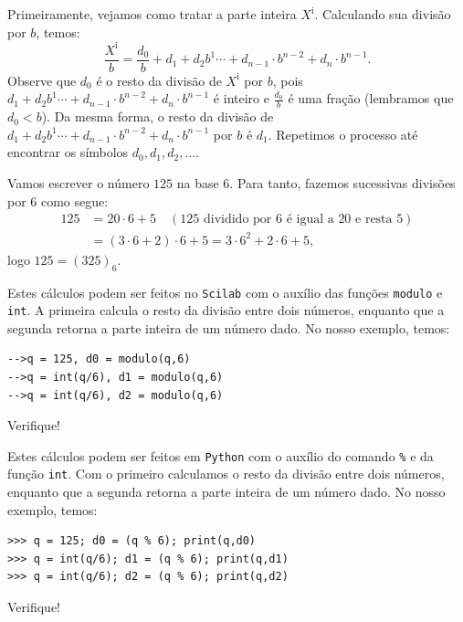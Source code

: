 Primeiramente, vejamos como tratar a parte inteira $X^{\mbox{i}}$. Calculando sua divisão por $b$, temos:
\begin{equation*}
  \frac{X^{\mbox{i}}}{b}=   \frac{d_0}{b}+d_1+d_2 b^1\cdots+d_{n-1}\cdot b^{n-2} +d_n\cdot b^{n-1}.  
\end{equation*}
Observe que $d_0$ é o resto da divisão de $X^{\mbox{i}}$ por $b$, pois $d_1+d_2 b^1\cdots+d_{n-1}\cdot b^{n-2} +d_n\cdot b^{n-1}$ é inteiro e $\frac{d_0}{b}$ é uma fração (lembramos que $d_0<b$). Da mesma forma, o resto da divisão de $d_1+d_2 b^1\cdots+d_{n-1}\cdot b^{n-2} +d_n\cdot b^{n-1}$ por $b$ é $d_1$. Repetimos o processo até encontrar os símbolos $d_0, d_1, d_2, \ldots$.

\begin{ex} Vamos escrever o número $125$ na base $6$. Para tanto, fazemos sucessivas divisões por $6$ como segue:
  \begin{equation*}
    \begin{split}
      125 &= 20\cdot 6 + 5\quad(\mbox{$125$ dividido por $6$ é igual a $20$ e resta $5$})\\
      &= (3\cdot 6 + 2)\cdot 6 + 5 = 3\cdot 6^2 + 2\cdot 6 + 5,      
    \end{split}
  \end{equation*}
logo $125 = (325)_6$.

\ifisscilab
Estes cálculos podem ser feitos no \verb+Scilab+ com o auxílio das funções \verb'modulo' e \verb'int'. A primeira calcula o resto da divisão entre dois números, enquanto que a segunda retorna a parte inteira de um número dado. No nosso exemplo, temos:
\begin{verbatim}
-->q = 125, d0 = modulo(q,6)
-->q = int(q/6), d1 = modulo(q,6)
-->q = int(q/6), d2 = modulo(q,6)
\end{verbatim}
Verifique!
\fi

\ifispython
Estes cálculos podem ser feitos em \verb+Python+ com o auxílio do comando \verb+%+ e da função \verb'int'. Com o primeiro calculamos o resto da divisão entre dois números, enquanto que a segunda retorna a parte inteira de um número dado. No nosso exemplo, temos:
\begin{verbatim}
>>> q = 125; d0 = (q % 6); print(q,d0)
>>> q = int(q/6); d1 = (q % 6); print(q,d1)
>>> q = int(q/6); d2 = (q % 6); print(q,d2)
\end{verbatim}
Verifique!
\fi
\end{ex}

